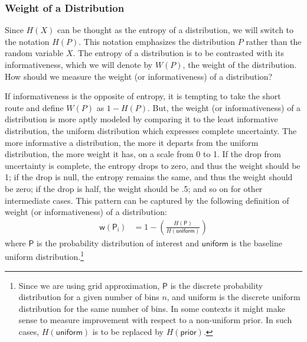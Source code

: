 \documentclass[
  10pt,
  dvipsnames,enabledeprecatedfontcommands]{scrartcl}
\begin{document}
\hypertarget{weight-of-a-distribution}{%
\subsubsection{Weight of a
Distribution}\label{weight-of-a-distribution}}

Since \(H(X)\) can be thought as the entropy of a distribution, we will
switch to the notation \(H(P)\). This notation emphasizes the
distribution \(P\) rather than the random variable \(X\). The entropy of
a distribution is to be contrasted with its informativeness, which we
will denote by \(W(P)\), the weight of the distribution. How should we
measure the weight (or informativeness) of a distribution?

If informativeness is the opposite of entropy, it is tempting to take
the short route and define \(W(P)\) as \(1-H(P)\). But, the weight (or
informativeness) of a distribution is more aptly modeled by comparing it
to the least informative distribution, the uniform distribution which
expresses complete uncertainty. The more informative a distribution, the
more it departs from the uniform distribution, the more weight it has,
on a scale from 0 to 1. If the drop from uncertainty is complete, the
entropy drops to zero, and thus the weight should be 1; if the drop is
null, the entropy remains the same, and thus the weight should be zero;
if the drop is half, the weight should be .5; and so on for other
intermediate cases. This pattern can be captured by the following
definition of weight (or informativeness) of a distribution:
\begin{align*}
\mathsf{w(P_i)} & = 1 - \left( \frac{H(\mathsf{P})}{H(\mathsf{uniform})}\right)
\end{align*} \noindent where \(\mathsf{P}\) is the probability
distribution of interest and \(\mathsf{uniform}\) is the baseline
uniform distribution.\footnote{Since we are using grid approximation,
  \(\mathsf{P}\) is the discrete probability distribution for a given
  number of bins \(n\), and uniform is the discrete uniform distribution
  for the same number of bins. In some contexts it might make sense to
  measure improvement with respect to a non-uniform prior. In such
  cases, \(H(\mathsf{uniform})\) is to be replaced by
  \(H(\mathsf{prior})\).}
\end{document}
